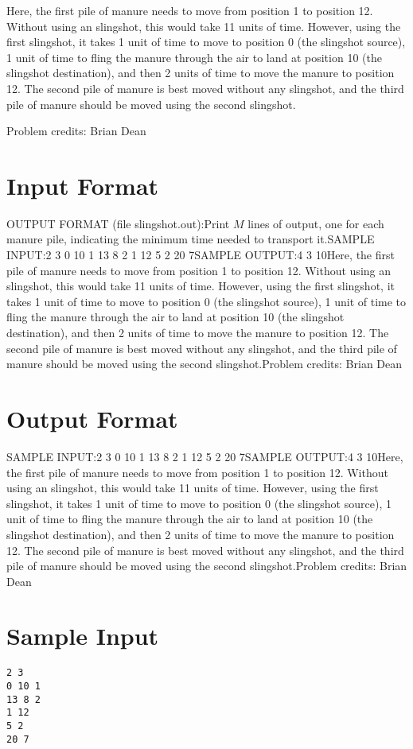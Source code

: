 \documentclass[12pt]{article}
\begin{document}
Here, the first pile of manure needs to move from position 1 to position 12. 
Without using an slingshot, this would take 11 units of time.  However, using
the first slingshot, it takes 1 unit of time to move to position 0 (the
slingshot source), 1 unit of time to fling the manure through the air to land at
position 10 (the slingshot destination), and then 2 units of time to move the
manure to position 12.  The second pile of manure is best moved without any
slingshot, and the third pile of manure should be moved using the second
slingshot.


Problem credits: Brian Dean



\section*{Input Format}
OUTPUT FORMAT (file slingshot.out):Print $M$ lines of output, one for each manure pile, indicating the minimum time
needed to transport it.SAMPLE INPUT:2 3
0 10 1
13 8 2
1 12
5 2
20 7SAMPLE OUTPUT:4
3
10Here, the first pile of manure needs to move from position 1 to position 12. 
Without using an slingshot, this would take 11 units of time.  However, using
the first slingshot, it takes 1 unit of time to move to position 0 (the
slingshot source), 1 unit of time to fling the manure through the air to land at
position 10 (the slingshot destination), and then 2 units of time to move the
manure to position 12.  The second pile of manure is best moved without any
slingshot, and the third pile of manure should be moved using the second
slingshot.Problem credits: Brian Dean

\section*{Output Format}
SAMPLE INPUT:2 3
0 10 1
13 8 2
1 12
5 2
20 7SAMPLE OUTPUT:4
3
10Here, the first pile of manure needs to move from position 1 to position 12. 
Without using an slingshot, this would take 11 units of time.  However, using
the first slingshot, it takes 1 unit of time to move to position 0 (the
slingshot source), 1 unit of time to fling the manure through the air to land at
position 10 (the slingshot destination), and then 2 units of time to move the
manure to position 12.  The second pile of manure is best moved without any
slingshot, and the third pile of manure should be moved using the second
slingshot.Problem credits: Brian Dean

\section*{Sample Input}
\begin{verbatim}
2 3
0 10 1
13 8 2
1 12
5 2
20 7
\end{verbatim}
\end{document}
